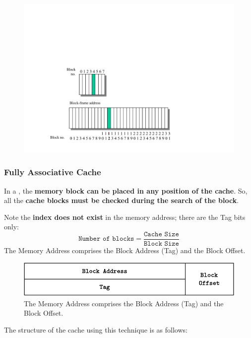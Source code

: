 \begin{figure}[!htp]
    \centering
    \includegraphics[width=.8\textwidth]{img/direct-mapped-cache-3.pdf}
\end{figure}

\newpage

\subsubsection*{\textcolor{Red2}{Fully Associative Cache}}\label{Fully Associative Cache}

In a , the \textbf{memory block can be placed in any position of the cache}. So, all the \textbf{cache blocks must be checked during the search of the block}.

\highspace
Note the \textbf{index does not exist} in the memory address; there are the Tag bits only:
\begin{equation}\label{eq: Fully Associative Cache}
    \texttt{Number of blocks} = \dfrac{\texttt{Cache Size}}{\texttt{Block Size}}
\end{equation}
The Memory Address comprises the Block Address (Tag) and the Block Offset.

\begin{figure}[!htp]
    \centering
    \includegraphics[width=.9\textwidth]{img/direct-mapped-cache-4.pdf}
    \caption{The Memory Address comprises the Block Address (Tag) and the Block Offset.}
\end{figure}

\noindent
The structure of the cache using this technique is as follows:

